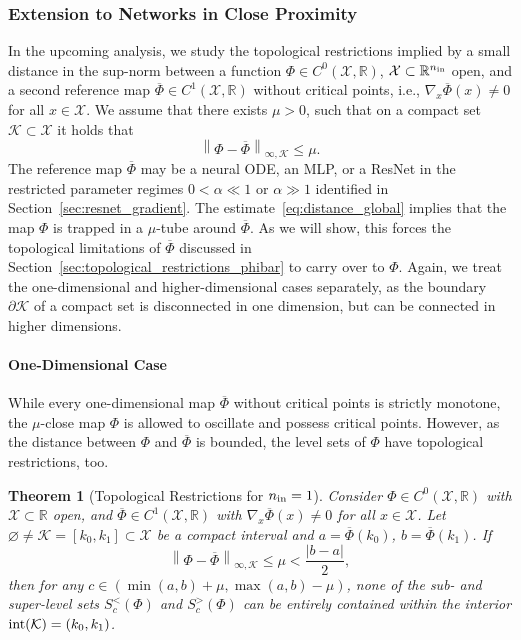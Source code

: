 \documentclass[10pt]{article}
\newtheorem{theorem}{Theorem}[section]
\theoremstyle{definition}
\numberwithin{equation}{section}
\newcommand\norm[1]{\left\lVert#1\right\rVert}
\newcommand\abs[1]{\left\lvert#1\right\rvert}
\newcommand{\R}{\mathbb{R}}
\newcommand*{\nin}{n_\textup{in}}
\begin{document}
\subsubsection{Extension to Networks in Close Proximity}

In the upcoming analysis, we study the topological restrictions implied by a small distance in the sup-norm between a function $\Phi \in C^0(\mathcal{X},\R)$, $\mathcal{X}\subset \R^{\nin}$ open, and a second reference map $\overline{\Phi} \in C^1(\mathcal{X},\R)$ without critical points, i.e., $\nabla_x\overline{\Phi}(x) \neq 0$ for all $x\in \mathcal{X}$. We assume that there exists $\mu>0$, such that on a compact set $\mathcal{K}\subset \mathcal{X}$ it holds that
\begin{equation}\label{eq:distance_global}
	\norm{\Phi-\overline{\Phi}}_{\infty,\mathcal{K}} \leq \mu.
\end{equation}
The reference map $\overline{\Phi}$ may be a neural ODE, an MLP, or a ResNet in the restricted parameter regimes $0<\alpha \ll 1$ or $\alpha \gg 1$ identified in Section~\ref{sec:resnet_gradient}.
The estimate~\eqref{eq:distance_global} implies that the map $\Phi$ is trapped in a $\mu$-tube around $\overline{\Phi}$. As we will show, this forces the topological limitations of $\overline{\Phi}$ discussed in Section~\ref{sec:topological_restrictions_phibar} to carry over to $\Phi$. Again, we treat the one-dimensional and higher-dimensional cases separately, as the boundary $\partial \mathcal{K}$ of a compact set is disconnected in one dimension, but can be connected in higher dimensions.

\paragraph{One-Dimensional Case}

While every one-dimensional map $\overline{\Phi}$ without critical points is strictly monotone, the $\mu$-close map $\Phi$ is allowed to oscillate and possess critical points. However, as the distance between $\Phi$ and $\overline{\Phi}$ is bounded, the level sets of $\Phi$ have topological restrictions, too.

 \begin{theorem}[Topological Restrictions for $\nin = 1$] \label{thm:constraints_1d}
    Consider $\Phi \in C^0(\mathcal{X},\R)$ with $\mathcal{X}\subset \R$ open, and $\overline{\Phi} \in C^1(\mathcal{X},\R)$ with $\nabla_x\overline{\Phi}(x) \neq 0$ for all $x\in \mathcal{X}$. Let $\varnothing \neq \mathcal{K} = [k_0,k_1] \subset \mathcal{X}$ be a compact interval and $a = \overline{\Phi}(k_0)$, $b = \overline{\Phi}(k_1)$. If
    \begin{equation*}
        \norm{\Phi - \overline{\Phi}}_{\infty,\mathcal{K}} \leq \mu < \frac{\abs{b-a}}{2},
    \end{equation*}
    then for any $c \in (\min(a,b) + \mu, \max(a,b) - \mu)$, none of the sub- and super-level sets $S_c^{<}(\Phi)$ and $S_c^{>}(\Phi)$ can be entirely contained within the interior $\textup{int}(\mathcal{K}) = (k_0, k_1)$.
\end{theorem}
\end{document}
